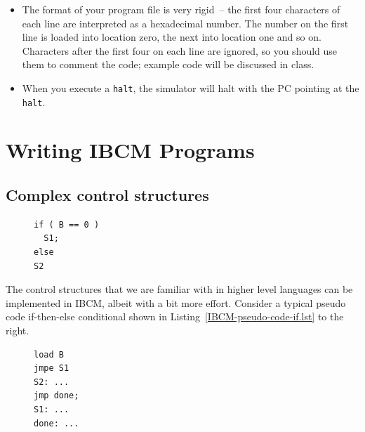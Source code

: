 \begin{itemize}
\item The format of your program file is very rigid~-- the first four
  characters of each line are interpreted as a hexadecimal number. The
  number on the first line is loaded into location zero, the next into
  location one and so on. Characters after the first four on each line
  are ignored, so you should use them to comment the code; example
  code will be discussed in class.

\item When you execute a {\tt halt}, the simulator will halt with the PC
  pointing at the {\tt halt}.

\end{itemize}

\section{Writing IBCM Programs}

\subsection{Complex control structures}

\begin{figure}
\vspace{-0.1in}
\begin{lstlisting}[caption={\bf if} pseudo code,backgroundcolor=\color{white},frame=trBL,linewidth=2in,xleftmargin=0.25in,label={IBCM-pseudo-code-if.lst}]
if ( B == 0 )
  S1;
else
S2
\end{lstlisting}
\vspace{0.25in}
\end{figure}

The control structures that we are familiar with in higher level
languages can be implemented in IBCM, albeit with a bit more effort.
Consider a typical pseudo code if-then-else conditional shown in
Listing~\ref{IBCM-pseudo-code-if.lst} to the right.

\begin{figure}
\vspace{-0.4in}
\begin{lstlisting}[backgroundcolor=\color{white},frame=trBL,linewidth=2in,xleftmargin=0.25in,label={IBCM-code-if.lst},caption={IBCM {\bf if} code}]
load B
jmpe S1
S2: ...
jmp done;
S1: ...
done: ...
\end{lstlisting}
\vspace{-0.25in}
\end{figure}

